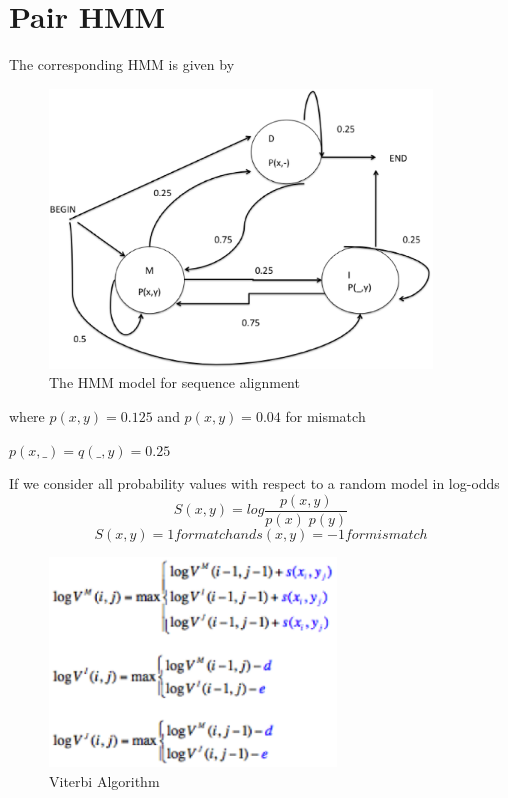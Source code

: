 \documentclass[english, a4paper,11pt]{article}
\begin{document}
\section{Pair HMM}

The corresponding HMM is given by

\begin{figure}
\begin{centering}
\includegraphics[width=4in]{Slide5}
\par\end{centering}

\caption{The HMM model for sequence alignment}
\end{figure}

where $p(x,y)=0.125$ and $p(x,y)=0.04$ for mismatch

$p(x,\_)=q(\_,y)=0.25$

If we consider all probability values with respect to a random model
in log-odds
$$
S(x,y)=log\frac{p(x,y)}{p(x)\; p(y)}
$$$$
S(x,y)=1 for match and s(x,y)=-1 for mismatch
$$

\begin{figure}
\begin{centering}
\includegraphics[width=3in]{Viterbi}
\par\end{centering}

\caption{Viterbi Algorithm}
\end{figure}
\end{document}
